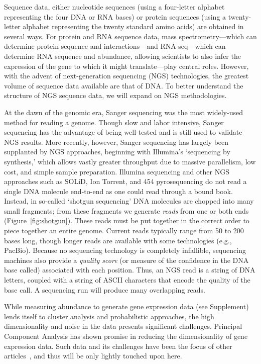 \documentclass{acm_proc_article-sp}
\begin{document}
Sequence data, either 
nucleotide sequences (using a four-letter alphabet representing the four
DNA or RNA bases) or protein sequences (using a twenty-letter alphabet 
representing the twenty standard amino acids)
are obtained in several ways.
For protein and RNA sequence data, mass spectrometry---which
can determine protein sequence and interactions---and RNA-seq---which can determine RNA sequence and abundance, 
allowing scientists to also infer the expression of the gene to which it might translate---play central roles.
However, with the advent of next-generation sequencing (NGS) technologies, the greatest volume of sequence data available are that of DNA.
To better understand the structure of NGS sequence data, we will expand on NGS methodologies.

At the dawn of the genomic era, Sanger sequencing was the most widely-used 
method for reading a genome.
Though slow and labor intensive, Sanger sequencing has the advantage of being
well-tested and is still used to validate NGS results.
More recently, however, Sanger sequencing has largely been supplanted by NGS approaches,
beginning with Illumina's `sequencing by synthesis,' which allows vastly 
greater throughput due to massive parallelism, low cost, and simple sample
preparation.
Illumina sequencing and other NGS approaches
such as SOLiD, Ion Torrent, and 454 pyrosequencing do not read a single DNA
molecule end-to-end as one could read through a bound book.
Instead, in so-called `shotgun sequencing' DNA molecules are chopped into many small fragments;
from these fragments we generate 
\emph{reads} from one or both ends (Figure~\ref{fig:shotgun}).
These reads must be put together in the correct order 
to piece together an entire genome.
Current reads typically range from 50 to 200 bases long, though longer reads are
available with some technologies (e.g., PacBio).
Because no sequencing technology is completely infallible, sequencing machines also
provide a \emph{quality score} (or measure of the confidence in the DNA base
called) associated with each position.
Thus, an NGS read is a string of DNA letters, coupled with a string of ASCII
characters that encode the quality of the base call.
A sequencing run will produce many overlapping reads.

While measuring abundance to generate gene expression data (see Supplement) lends itself to cluster analysis 
and probabilistic 
approaches, the high dimensionality and noise in the data presents significant 
challenges.
Principal Component Analysis has shown promise in reducing the dimensionality
of gene expression 
data.
Such data and its challenges have been the focus of other 
articles~\cite{berger2013computational}, and thus will be only lightly touched 
upon here.
\end{document}
